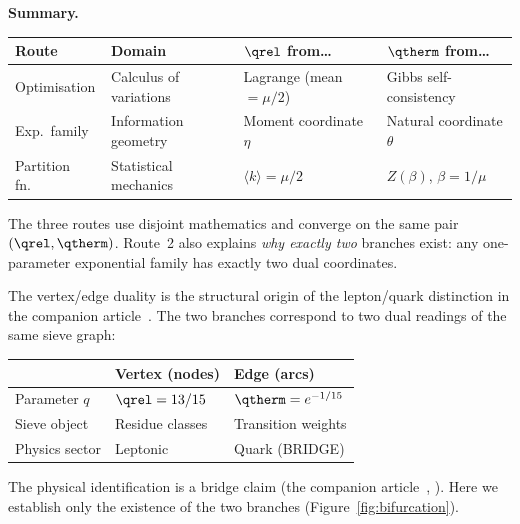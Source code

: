 \documentclass[12pt,a4paper]{article}
\begin{document}
\begin{remark}
\medskip\noindent
\textbf{Summary.}
\begin{center}
\begin{tabular}{llll}
\toprule
\textbf{Route} & \textbf{Domain} & \textbf{$\qrel$ from\ldots} & \textbf{$\qtherm$ from\ldots} \\
\midrule
Optimisation & Calculus of variations & Lagrange (mean $= \mu/2$) & Gibbs self-consistency \\
Exp.\ family & Information geometry & Moment coordinate $\eta$ & Natural coordinate $\theta$ \\
Partition fn.\ & Statistical mechanics & $\langle k \rangle = \mu/2$ & $Z(\beta)$, $\beta = 1/\mu$ \\
\bottomrule
\end{tabular}
\end{center}
The three routes use disjoint mathematics and converge on the same
pair $(\qrel, \qtherm)$.
Route~2 also explains \emph{why exactly two} branches exist: any
one-parameter exponential family has exactly two dual coordinates.
\end{remark}

\begin{remark}
The vertex/edge duality is the structural origin of the lepton/quark
distinction in the companion article~\cite{companion_M5}. The two branches correspond to
two dual readings of the same sieve graph:
\begin{center}
\begin{tabular}{lll}
\toprule
& \textbf{Vertex (nodes)} & \textbf{Edge (arcs)} \\
\midrule
Parameter $q$ & $\qrel = 13/15$ & $\qtherm = e^{-1/15}$ \\
Sieve object & Residue classes & Transition weights \\
Physics sector & Leptonic & Quark (BRIDGE) \\
\bottomrule
\end{tabular}
\end{center}
The physical identification is a bridge claim (the companion article~\cite{companion_M5}, \BRIDGETAG).
Here we establish only the existence of the two branches
(Figure~\ref{fig:bifurcation}).
\end{remark}
\end{document}
